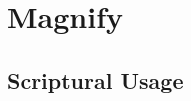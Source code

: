 \section{Magnify}
	\label{MAGNIFY}
	




	


\subsection{Scriptural Usage} %
	\label{MAGNIFY-SCRIPTURES}

